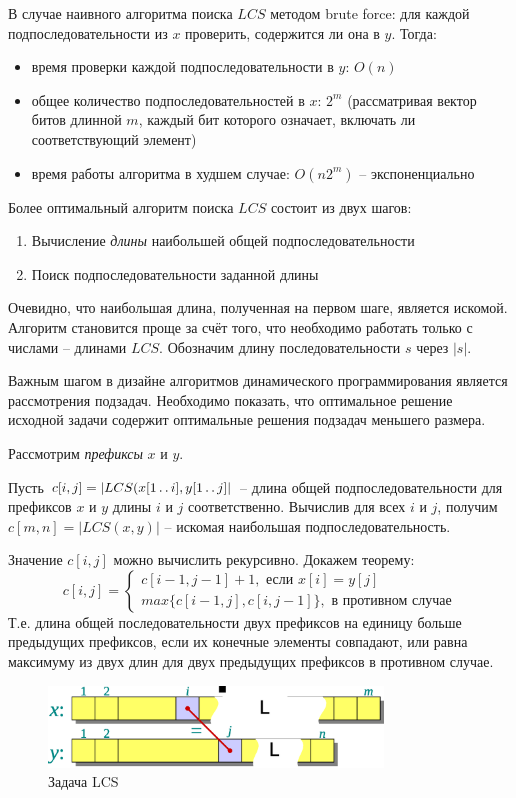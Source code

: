 \documentclass[11pt]{article}
\begin{document}
В случае наивного алгоритма поиска $LCS$ методом brute force: для каждой подпоследовательности из $x$ проверить, содержится ли она в $y$. Тогда:
\begin{itemize}
\item время проверки каждой подпоследовательности в $y$: $O(n)$
\item общее количество подпоследовательностей в $x$: $2^m$ (рассматривая вектор битов длинной $m$, каждый бит которого означает, включать ли соответствующий элемент)
\item время работы алгоритма в худшем случае: $O(n2^m)$ -- экспоненциально
\end{itemize}

Более оптимальный алгоритм поиска $LCS$ состоит из двух шагов:
\begin{enumerate}
\item Вычисление \emph{длины} наибольшей общей подпоследовательности
\item Поиск подпоследовательности заданной длины
\end{enumerate}
Очевидно, что наибольшая длина, полученная на первом шаге, является искомой. Алгоритм становится проще за счёт того, что необходимо работать только с числами -- длинами $LCS$. Обозначим длину последовательности $s$ через $|s|$.

Важным шагом в дизайне алгоритмов динамического программирования является рассмотрения подзадач. Необходимо показать, что оптимальное решение исходной задачи содержит оптимальные решения подзадач меньшего размера.

Рассмотрим \emph{префиксы} $x$ и $y$. 

Пусть $c[i, j] = |LCS(x[1 \mathinner{\ldotp\ldotp} i], y[1 \mathinner{\ldotp\ldotp} j]|$ -- длина общей подпоследовательности для префиксов $x$ и $y$ длины $i$ и $j$ соответственно. Вычислив для всех $i$ и $j$, получим $c[m, n] = |LCS(x, y)|$ -- искомая наибольшая подпоследовательность.

Значение $c[i, j]$ можно вычислить рекурсивно. Докажем теорему:
\begin{equation*}
  c[i, j] = \begin{cases}
    c[i-1, j-1] + 1, \text{ если } x[i] = y[j] \\
    max\{c[i-1, j], c[i, j-1]\}, \text{ в противном случае}
    \end{cases}
\end{equation*}
Т.е. длина общей последовательности двух префиксов на единицу больше предыдущих префиксов, если их конечные элементы совпадают, или равна максимуму из двух длин для двух предыдущих префиксов в противном случае.
\begin{figure}[ht]
  \centering
  \includegraphics[width=3.5in]{lecture15/lcs.eps}
  \caption{Задача LCS}
\end{figure}
\end{document}
